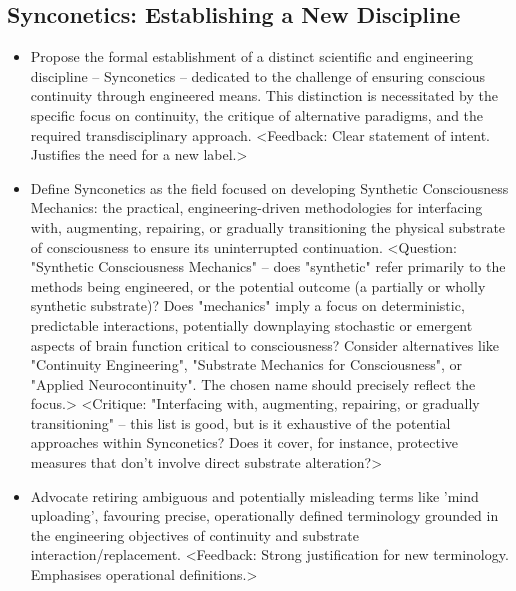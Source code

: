 \documentclass[10pt]{article}
\begin{document}
\begin{sloppypar}
  \subsection{Synconetics: Establishing a New Discipline}
  \label{sec:new-discipline}

  \begin{itemize}

    \item Propose the formal establishment of a distinct scientific and engineering discipline – Synconetics – dedicated to the challenge of ensuring conscious continuity through engineered means. This distinction is necessitated by the specific focus on continuity, the critique of alternative paradigms, and the required transdisciplinary approach. <Feedback: Clear statement of intent. Justifies the need for a new label.>

    \item Define Synconetics as the field focused on developing Synthetic Consciousness Mechanics: the practical, engineering-driven methodologies for interfacing with, augmenting, repairing, or gradually transitioning the physical substrate of consciousness to ensure its uninterrupted continuation. <Question: "Synthetic Consciousness Mechanics" – does "synthetic" refer primarily to the methods being engineered, or the potential outcome (a partially or wholly synthetic substrate)? Does "mechanics" imply a focus on deterministic, predictable interactions, potentially downplaying stochastic or emergent aspects of brain function critical to consciousness? Consider alternatives like "Continuity Engineering", "Substrate Mechanics for Consciousness", or "Applied Neurocontinuity". The chosen name should precisely reflect the focus.> <Critique: "Interfacing with, augmenting, repairing, or gradually transitioning" – this list is good, but is it exhaustive of the potential approaches within Synconetics? Does it cover, for instance, protective measures that don't involve direct substrate alteration?>

    \item Advocate retiring ambiguous and potentially misleading terms like 'mind uploading', favouring precise, operationally defined terminology grounded in the engineering objectives of continuity and substrate interaction/replacement. <Feedback: Strong justification for new terminology. Emphasises operational definitions.>


\end{itemize}
\end{sloppypar}
\end{document}
